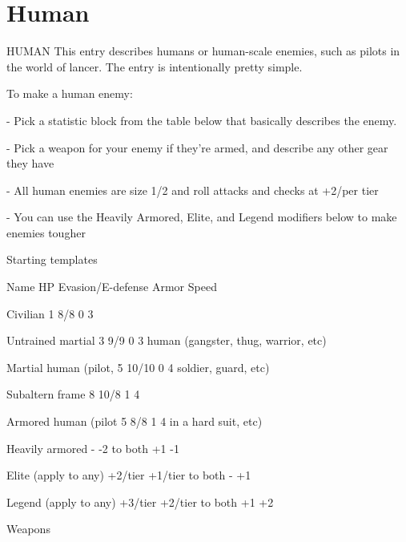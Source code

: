 \section{Human}
                                                HUMAN  
This entry describes humans or human-scale enemies, such as pilots in the world of lancer. The  
entry is intentionally pretty simple.
 

To make a human enemy:
 
            -   Pick a statistic block from the table below that basically describes the enemy. 
 
            -   Pick a weapon for your enemy if they’re armed, and describe any other gear they  
                have
 
            -   All human enemies are size 1/2 and roll attacks and checks at +2/per tier
 
            -   You can use the Heavily Armored, Elite, and Legend modifiers below to make  
                enemies tougher
 

                                           Starting templates  

 Name                        HP         Evasion/E-defense            Armor                   Speed 

 Civilian                    1          8/8                          0                       3 

 Untrained martial           3          9/9                          0                       3 
 human (gangster, thug,  
 warrior, etc) 

 Martial human (pilot,       5          10/10                        0                       4 
 soldier, guard, etc) 

 Subaltern frame             8          10/8                         1                       4 

 Armored human (pilot        5          8/8                          1                       4 
 in a hard suit, etc) 

 Heavily armored             -          -2 to both                   +1                      -1 

 Elite (apply to any)        +2/tier    +1/tier to both              -                       +1 

 Legend (apply to any)       +3/tier    +2/tier to both              +1                      +2 

                                                Weapons  

